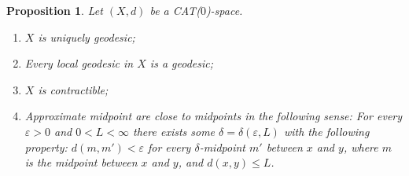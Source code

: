 \documentclass[11pt, a4paper, oneside]{memoir}
\theoremstyle{plain}\newtheorem{theorem}[subsection]{Theorem}
\newtheorem{proposition}[subsection]{Proposition}
\theoremstyle{definition}
\newcommand{\parenum}{\setenumerate[1]{label=\textbf{(\arabic*)}}}
\begin{document}
\begin{proposition}\label{prop:apmid_close}
Let \((X,d)\) be a CAT($0$)-space.
\parenum
\begin{enumerate}
    \item \(X\) is uniquely geodesic;
    \item Every local geodesic in \(X\) is a geodesic;
    \item \(X\) is contractible;
    \item Approximate midpoint are close to midpoints in the following sense:
    For every \(\varepsilon>0\) and \(0<L<\infty\) there exists some \(\delta=\delta(\varepsilon,L)\) with the following property: \(d(m,m')<\varepsilon\) for every \(\delta\)-midpoint \(m'\) between \(x\) and \(y\), where \(m\) is the midpoint between \(x\) and \(y\), and \(d(x,y)\leq L\).
\end{enumerate}
\end{proposition}
\end{document}
